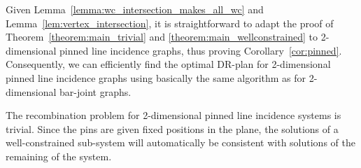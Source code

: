 Given Lemma~\ref{lemma:wc_intersection_makes_all_wc} and Lemma~\ref{lem:vertex_intersection},
it is straightforward to adapt the proof of Theorem~\ref{theorem:main_trivial} and \ref{theorem:main_wellconstrained}
to  2-dimensional pinned line incidence graphs,
thus proving Corollary~\ref{cor:pinned}.
Consequently, we can efficiently find the optimal DR-plan for 2-dimensional pinned line incidence graphs using basically the same algorithm as for 2-dimensional bar-joint graphs.

The recombination problem for 2-dimensional pinned line incidence systems is trivial.
Since the pins are given fixed positions in the plane,
 the solutions of a well-constrained sub-system will automatically be consistent with solutions of the remaining of the system.

